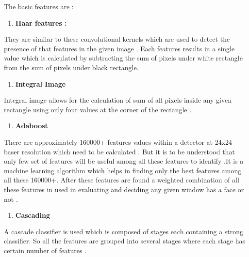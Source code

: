\documentclass{article} %
\begin{document}
\noindent The basic features are :

\begin{enumerate}
\item  \textbf{Haar features :}
\end{enumerate}

\noindent They are similar to these convolutional kernels which are used to detect the presence of that features in the given image . Each features results in a single value which is calculated by subtracting the sum of pixels under white rectangle from the sum of pixels under black rectangle.  

\begin{enumerate}
\item  \textbf{Integral Image }
\end{enumerate}

\noindent Integral image allows for the calculation of sum of all pixels inside any given rectangle using only four values at the corner of the rectangle .

\begin{enumerate}
\item  \textbf{Adaboost}
\end{enumerate}

\noindent There are approximately 160000+ features values within a detector at 24x24 baser resolution which need to be calculated . But it is to be understood that only few set of features will be useful among all these features to identify .It is a machine learning algorithm which helps in finding only the best features among all these 160000+. After these features are found a weighted combination of all these features in used in evaluating and deciding any given window has a face or not .

\begin{enumerate}
\item  \textbf{Cascading}
\end{enumerate}

\noindent A cascade classifier is used which is composed of stages each containing a strong classifier. So all the features are grouped into several stages where each stage has certain number of features .

\noindent 

\noindent 
\paragraph{}

\noindent 
\end{document}
